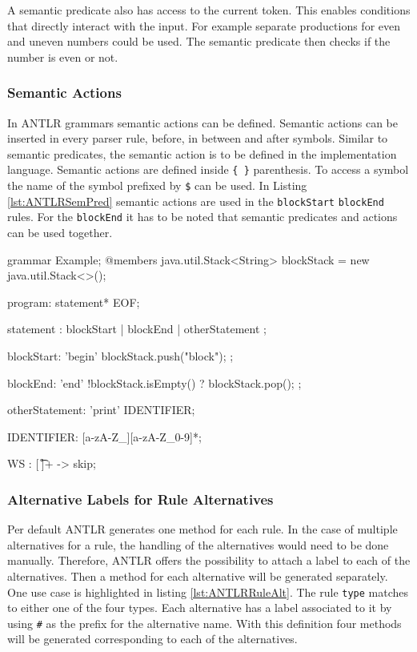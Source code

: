 A semantic predicate also has access to the current token. This enables conditions that directly interact with the input. For example separate productions for even and uneven numbers could be used. The semantic predicate then checks if the number is even or not.  


\subsubsection{Semantic Actions}

In ANTLR grammars semantic actions can be defined. Semantic actions can be inserted in every parser rule, before, in between and after symbols. Similar to semantic predicates, the semantic action is to be defined in the implementation language. Semantic actions are defined inside \verb|{ }| parenthesis. To access a symbol the name of the symbol prefixed by \verb|$| can be used. In Listing \ref{lst:ANTLRSemPred} semantic actions are used in the \texttt{blockStart} \texttt{blockEnd} rules. For the \texttt{blockEnd} it has to be noted that semantic predicates and actions can be used together. 


\begin{AntlrCode}[float,numbers=none,caption=Example grammar using a semantic predicate and a semantic action., label=lst:ANTLRSemPred]
grammar Example;
@members {
    java.util.Stack<String> blockStack = new java.util.Stack<>();
}

program: statement* EOF;

statement
    : blockStart
    | blockEnd
    | otherStatement
    ;

blockStart: 'begin' { blockStack.push("block"); };

blockEnd: 'end' { !blockStack.isEmpty() }? { blockStack.pop(); };

otherStatement: 'print' IDENTIFIER;

IDENTIFIER: [a-zA-Z_][a-zA-Z_0-9]*;

WS  : [ \t\r\n]+ -> skip;
\end{AntlrCode}


\subsubsection{Alternative Labels for Rule Alternatives}

Per default ANTLR generates one method for each rule. In the case of multiple alternatives for a rule, the handling of the alternatives would need to be done manually. Therefore, ANTLR offers the possibility to attach a label to each of the alternatives. Then a method for each alternative will be generated separately. One use case is highlighted in listing \ref{lst:ANTLRRuleAlt}. The rule \texttt{type} matches to either one of the four types. Each alternative has a label associated to it by using \verb|#| as the prefix for the alternative name. With this definition four methods will be generated corresponding to each of the alternatives.     

